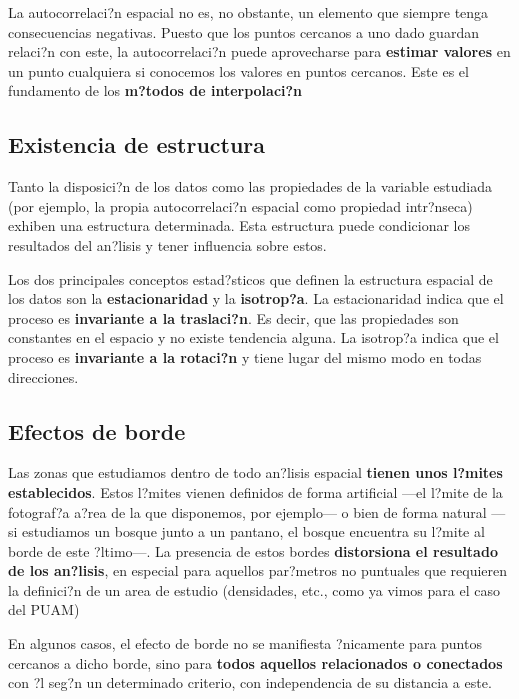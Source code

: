 La autocorrelaci?n espacial no es, no obstante, un elemento que siempre tenga consecuencias negativas. Puesto que los puntos cercanos a uno dado guardan relaci?n con este, la autocorrelaci?n puede aprovecharse para \textbf{estimar valores} en un punto cualquiera si conocemos los valores en puntos cercanos. Este es el fundamento de los \textbf{m?todos de interpolaci?n}


\subsection{Existencia de estructura}

Tanto la disposici?n de los datos como las propiedades de la variable estudiada (por ejemplo, la propia autocorrelaci?n espacial como propiedad intr?nseca) exhiben una estructura determinada. Esta estructura puede condicionar los resultados del an?lisis y tener influencia sobre estos.

Los dos principales conceptos estad?sticos que definen la estructura espacial de los datos son la \textbf{estacionaridad} y la \textbf{isotrop?a}. La estacionaridad indica que el proceso es \textbf{invariante a la traslaci?n}. Es decir, que las propiedades son constantes en el espacio y no existe tendencia alguna. La isotrop?a indica que el proceso es \textbf{invariante a la rotaci?n} y tiene lugar del mismo modo en todas direcciones. 


\subsection{Efectos de borde}


Las zonas que estudiamos dentro de todo an?lisis espacial \textbf{tienen unos l?mites establecidos}. Estos l?mites vienen definidos de forma artificial ---el l?mite de la fotograf?a a?rea de la que disponemos, por ejemplo--- o bien de forma natural ---si estudiamos un bosque junto a un pantano, el bosque encuentra su l?mite al borde de este ?ltimo---. La presencia de estos bordes \textbf{distorsiona el resultado de los an?lisis}, en especial para aquellos par?metros no puntuales que requieren la definici?n de un area de estudio (densidades, etc., como ya vimos para el caso del PUAM)

En algunos casos, el efecto de borde no se manifiesta ?nicamente para puntos cercanos a dicho borde, sino para \textbf{todos aquellos relacionados o conectados} con ?l seg?n un determinado criterio, con independencia de su distancia a este.


\pagestyle{empty}